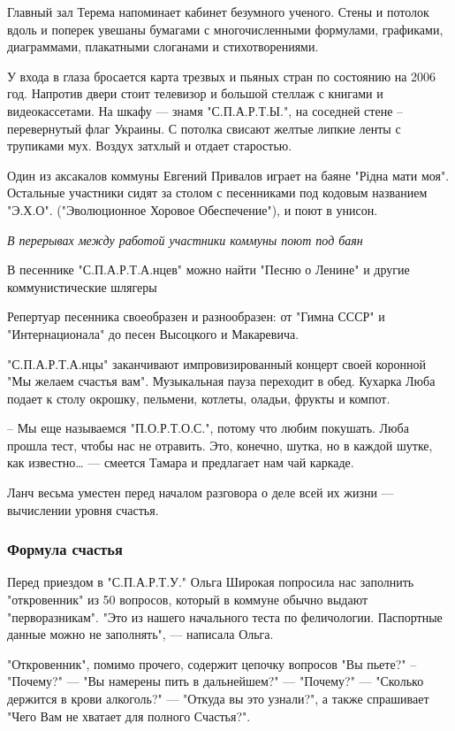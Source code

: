 \documentclass[a4paper,11pt]{extreport}
\begin{document}
Главный зал Терема напоминает кабинет безумного ученого. Стены и потолок вдоль
и поперек увешаны бумагами с многочисленными формулами, графиками, диаграммами,
плакатными слоганами и стихотворениями. 

У входа в глаза бросается карта трезвых и пьяных стран по состоянию на 2006
год. Напротив двери стоит телевизор и большой стеллаж с книгами и
видеокассетами. На шкафу --- знамя "С.П.А.Р.Т.Ы.", на соседней стене –
перевернутый флаг Украины. С потолка свисают желтые липкие ленты с трупиками
мух. Воздух затхлый и отдает старостью.

Один из аксакалов коммуны Евгений Привалов играет на баяне "Рідна мати моя".
Остальные участники сидят за столом с песенниками под кодовым названием
"Э.Х.О". ("Эволюционное Хоровое Обеспечение"), и поют в унисон.

{\em
В перерывах между работой участники коммуны поют под баян
\/}

В песеннике "С.П.А.Р.Т.А.нцев" можно найти "Песню о Ленине" и другие
коммунистические шлягеры

Репертуар песенника своеобразен и разнообразен: от "Гимна СССР" и
"Интернационала" до песен Высоцкого и Макаревича.

"С.П.А.Р.Т.А.нцы" заканчивают импровизированный концерт своей коронной "Мы
желаем счастья вам". Музыкальная пауза переходит в обед. Кухарка Люба подает к
столу окрошку, пельмени, котлеты, оладьи, фрукты и компот.

– Мы еще называемся "П.О.Р.Т.О.С.", потому что любим покушать. Люба прошла
тест, чтобы нас не отравить. Это, конечно, шутка, но в каждой шутке, как
известно… --- смеется Тамара и предлагает нам чай каркаде.

Ланч весьма уместен перед началом разговора о деле всей их жизни --- вычислении
уровня счастья.

\subsubsection{Формула счастья}

Перед приездом в "С.П.А.Р.Т.У." Ольга Широкая попросила нас заполнить
"откровенник" из 50 вопросов, который в коммуне обычно выдают "перворазникам".
"Это из нашего начального теста по феличологии. Паспортные данные можно не
заполнять", --- написала Ольга.

"Откровенник", помимо прочего, содержит цепочку вопросов "Вы пьете?" –
"Почему?" --- "Вы намерены пить в дальнейшем?" --- "Почему?" --- "Сколько держится в
крови алкоголь?" --- "Откуда вы это узнали?", а также спрашивает "Чего Вам не
хватает для полного Счастья?". 
\end{document}
